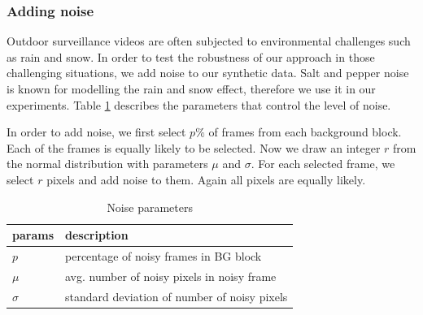 \subsubsection{Adding noise}
Outdoor surveillance videos are often subjected to environmental challenges such as rain and snow. In order to test the robustness of our approach in those challenging situations, we add noise to our synthetic data. Salt and pepper noise \cite{marques2011practical} is known for modelling the rain and snow effect, therefore we use it in our experiments. 
Table \ref{table:noise-params} describes the parameters that control the level of noise. 

In order to add noise, we first select $p\%$ of frames from each background block. Each of the frames is equally likely to be selected. Now we draw an integer $r$ from the normal distribution with parameters $\mu$ and $\sigma$. For each selected frame, we select $r$ pixels and add noise to them. Again all pixels are equally likely. 

\begin{table}
\centering
\caption{Noise parameters}  \vspace{5pt}
\label{table:noise-params}
\begin{tabular}{|l|l|}
\hline
params & description                              \\ \hline \hline
$p$          & percentage of noisy frames in BG block  \\ \hline
$\mu$        & avg. number of noisy pixels in noisy frame     \\ \hline
$\sigma$     & standard deviation of number of noisy pixels     \\ \hline
\end{tabular}
\end{table}
